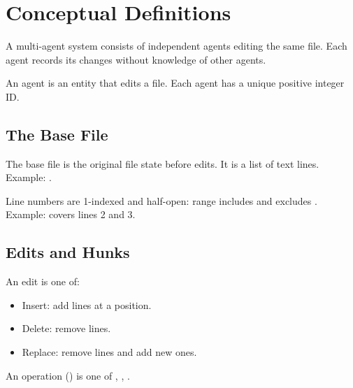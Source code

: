 \section{Conceptual Definitions}

\begin{definition}\label{def:multi-agent-system}
A multi-agent system consists of independent agents editing the same file.
Each agent records its changes without knowledge of other agents.
\end{definition}

\begin{definition}[Agent]\label{def:agent}
An agent is an entity that edits a file. Each agent has a unique positive integer ID.
\end{definition}

\subsection{The Base File}

\begin{definition}\label{def:base-file}
The base file is the original file state before edits. It is a list of text lines.
Example: \code{["name = Alice", "greeting = hello", "print greeting"]}.
\end{definition}

\begin{definition}\label{def:line-number}
Line numbers are 1-indexed and half-open: range \code{[start, stop)} includes  and excludes .
Example: \code{[2, 4]} covers lines 2 and 3.
\end{definition}

\subsection{Edits and Hunks}

\begin{definition}[Edit]\label{def:edit}
An edit is one of:
\begin{itemize}
  \item Insert: add lines at a position.
  \item Delete: remove lines.
  \item Replace: remove lines and add new ones.
\end{itemize}
\end{definition}

\begin{definition}[Operation]\label{def:operation}
An operation () is one of , , .
\end{definition}


